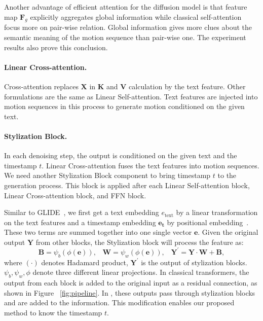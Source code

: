 Another advantage of efficient attention for the diffusion model is that feature map $\mathbf{F}_g$ explicitly aggregates global information while classical self-attention focus more on pair-wise relation. Global information gives more clues about the semantic meaning of the motion sequence than pair-wise one. The experiment results also prove this conclusion.

\paragraph{Linear Cross-attention.} Cross-attention replaces $\mathbf{X}$ in $\mathbf{K}$ and $\mathbf{V}$ calculation by the text feature. Other formulations are the same as Linear Self-attention. Text features are injected into motion sequences in this process to generate motion conditioned on the given text. 

\paragraph{Stylization Block.} In each denoising step, the output is conditioned on the given text and the timestamp $t$. Linear Cross-attention fuses the text features into motion sequences. We need another Stylization Block component to bring timestamp $t$ to the generation process. This block is applied after each Linear Self-attention block, Linear Cross-attention block, and FFN block.

Similar to GLIDE~\citep{nichol2021glide}, we first get a text embedding $e_{\textrm{text}}$ by a linear transformation on the text features and a timestamp embedding $\mathbf{e_t}$ by positional embedding~\citep{vaswani2017attention}. These two terms are summed together into one single vector $\mathbf{e}$. Given the original output $\mathbf{Y}$ from other blocks, the Stylization block will process the feature as:
\begin{equation}
\mathbf{B} = \psi_b(\phi(\mathbf{e})),\;\;\; \mathbf{W} = \psi_w(\phi(\mathbf{e})),\;\;\; \mathbf{Y}^{\prime}=\mathbf{Y} \cdot \mathbf{W} + \mathbf{B},
\end{equation}
where $(\cdot)$ denotes Hadamard product, $\mathbf{Y}^{\prime}$ is the output of stylization blocks. $\psi_b, \psi_w, \phi$ denote three different linear projections. In classical transformers, the output from each block is added to the original input as a residual connection, as shown in Figure ~\ref{fig:pipeline}. In \name, these outputs pass through stylization blocks and are added to the information. This modification enables our proposed method to know the timestamp $t$. 

